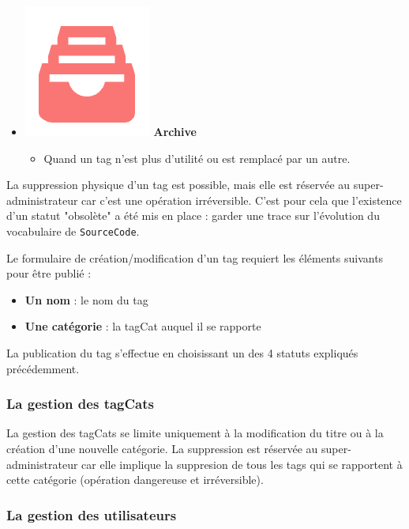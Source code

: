 \begin{itemize}
    \item \includegraphics[valign=b,height=1.4\fontcharht\font`X]{images/client/archive.png} \textbf{Archive}
    \begin{itemize}
        \item Quand un \gls{tag} n'est plus d'utilité ou est remplacé par un autre.
    \end{itemize}
\end{itemize}

La suppression physique d'un \gls{tag} est possible, mais elle est réservée au super-administrateur car c'est une opération irréversible. C'est pour cela que l'existence d'un statut "obsolète" a été mis en place : garder une trace sur l'évolution du vocabulaire de \texttt{SourceCode}.


Le formulaire de création/modification d'un \gls{tag} requiert les éléments suivants pour être publié :

\begin{itemize}
    \item \textbf{Un nom} : le nom du \gls{tag}
    \item \textbf{Une catégorie} : la \gls{tagCat} auquel il se rapporte
\end{itemize}

La publication du \gls{tag} s'effectue en choisissant un des 4 statuts expliqués précédemment.


\subsubsection{La gestion des \glspl{tagCat}}

La gestion des \glspl{tagCat} se limite uniquement à la modification du titre ou à la création d'une nouvelle catégorie. La suppression est réservée au super-administrateur car elle implique la suppresion de tous les \glspl{tag} qui se rapportent à cette catégorie (opération dangereuse et irréversible).

\subsubsection{La gestion des utilisateurs}

